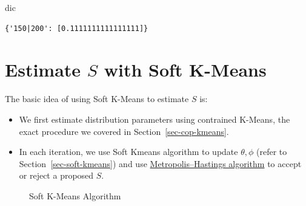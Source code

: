 \documentclass[
  letterpaper,
  DIV=11,
  numbers=noendperiod]{scrreprt}
\newenvironment{Shaded}{\begin{snugshade}}{\end{snugshade}}
\newcommand{\NormalTok}[1]{\textcolor[rgb]{0.00,0.23,0.31}{#1}}
\providecommand{\tightlist}{%
  \setlength{\itemsep}{0pt}\setlength{\parskip}{0pt}}\usepackage{longtable,booktabs,array}
\begin{document}
\begin{Shaded}
\begin{Highlighting}[]
\NormalTok{dic}
\end{Highlighting}
\end{Shaded}

\begin{verbatim}
{'150|200': [0.1111111111111111]}
\end{verbatim}


\chapter{\texorpdfstring{Estimate \(S\) with Soft
K-Means}{Estimate S with Soft K-Means}}\label{sec-estS-soft-kmeans}

The basic idea of using Soft K-Means to estimate \(S\) is:

\begin{itemize}
\tightlist
\item
  We first estimate distribution parameters using contrained K-Means,
  the exact procedure we covered in Section~\ref{sec-cop-kmeans}.
\item
  In each iteration, we use Soft Kmeans algorithm to update
  \(\theta, \phi\) (refer to Section~\ref{sec-soft-kmeans}) and use
  \href{https://en.wikipedia.org/wiki/Metropolis\%E2\%80\%93Hastings_algorithm}{Metropolis--Hastings
  algorithm} to accept or reject a proposed \(S\).
\end{itemize}

\begin{figure}


\caption{\label{fig-soft-kmeans-algo}Soft K-Means Algorithm}

\end{figure}%
\end{document}
